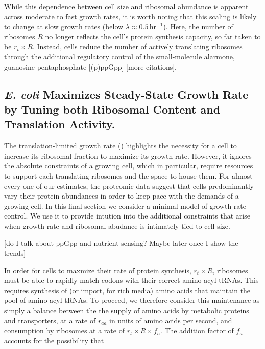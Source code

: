While this dependence between cell size and ribosomal abundance is apparent
across moderate to fast growth rates, it is worth noting that this scaling is
likely to change at slow growth rates (below $\lambda \approx
0.5\,\text{hr}^{-1}$). Here, the number of ribosomes $R$ no longer reflects the
cell's protein synthesis capacity, so far taken to be $r_t
\times R$. Instead, cells reduce the number of actively translating
ribosomes through the additional regulatory control of the small-molecule
alarmone, guanosine pentaphosphate [(p)ppGpp] \citep{dai2016} [more citations].


\subsection{\textit{E. coli} Maximizes Steady-State Growth
Rate by Tuning both Ribosomal Content and Translation Activity.}

The translation-limited growth rate ()
highlights the necessity for a cell to increase its ribosomal fraction to
maximize its growth rate. However, it ignores the absolute constraints of a
growing cell, which in particular, require resources to support each translating
ribosomes and the space to house them. For almost every one of our estimates,
the proteomic data suggest that cells predominantly vary their protein
abundances in order to keep pace with the demands of a growing cell. In this
final section we consider a minimal model of growth rate control. We use it to
provide intution into the additional constraints that arise when growth rate and
ribosomal abudance is intimately tied to cell size.

[do I talk about ppGpp and nutrient sensing? Maybe later once I show the trends]

In order for cells to maxmize their rate of protein synthesis, $r_t
\times R$, ribosomes must be able to rapidly match codons with their correct
amino-acyl tRNAs. This requires synthesis of (or import, for rich media) amino acids that
maintain the pool of amino-acyl tRNAs. To proceed, we therefore consider
this maintenance as simply a balance between the the supply of amino acids
by metabolic proteins and transporters, at a rate of $r_{aa}$ in units of amino acids per second,
and consumption by ribosomes at a rate of $r_t
\times R \times f_a$. The addition factor of $f_a$ accounts for the possibility
that





